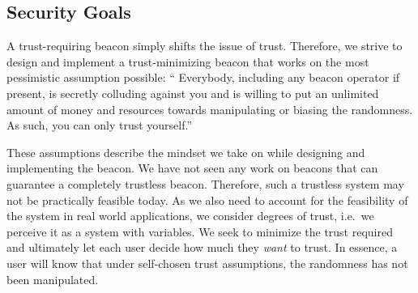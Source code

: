 \subsection{Security Goals}\label{sec:security_goals}
A trust-requiring beacon simply shifts the issue of trust.
Therefore, we strive to design and implement a trust-minimizing beacon that works on the most pessimistic assumption possible:
\enquote{%
Everybody, including any beacon operator if present, is secretly colluding against you and is willing to put an unlimited amount of money and resources towards manipulating or biasing the randomness.
As such, you can only trust yourself.}

These assumptions describe the mindset we take on while designing and implementing the beacon.
We have not seen any work on beacons that can guarantee a completely trustless beacon. Therefore, such a trustless system may not be practically feasible today.
As we also need to account for the feasibility of the system in real world applications, we consider degrees of trust, i.e.\ we perceive it as a system with variables.
We seek to minimize the trust required and ultimately let each user decide how much they \emph{want} to trust.
In essence, a user will know that under self-chosen trust assumptions, the randomness has not been manipulated.
